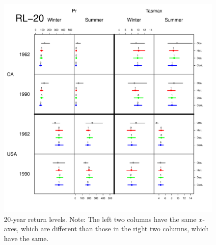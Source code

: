 \begin{figure}
\begin{center}
 \includegraphics[scale=0.61]{figs/rl20.pdf}
\end{center}
\caption{20-year return levels. Note: The left two columns have the same $x$-axes, which are different than those in the right two columns, which have the same.}
\label{20rl}
\end{figure}

